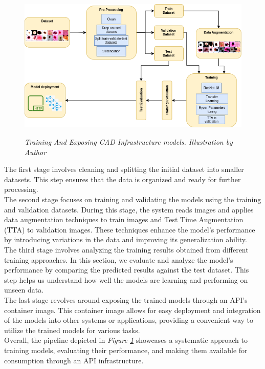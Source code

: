 \begin{figure}[H]
\centering
\includegraphics[width=\textwidth]{imatges/methodological_contribution/Pipeline.drawio.png}
\caption[Training And Exposing CAD Infrastructure models]{\textit{Training And Exposing CAD Infrastructure models. Illustration by Author}}
{\label{fig:cad-infrastructure-training-system}}
\end{figure}

The first stage involves cleaning and splitting the initial dataset into smaller datasets. This step ensures that the data is organized and ready for further processing. \\

The second stage focuses on training and validating the models using the training and validation datasets. During this stage, the system reads images and applies data augmentation techniques to train images and Test Time Augmentation (TTA) to validation images. These techniques enhance the model's performance by introducing variations in the data and improving its generalization ability. \\

The third stage involves analyzing the training results obtained from different training approaches. In this section, we evaluate and analyze the model's performance by comparing the predicted results against the test dataset. This step helps us understand how well the models are learning and performing on unseen data. \\

The last stage revolves around exposing the trained models through an API's container image. This container image allows for easy deployment and integration of the models into other systems or applications, providing a convenient way to utilize the trained models for various tasks. \\

Overall, the pipeline depicted in \textit{Figure \ref{fig:cad-infrastructure-training-system}} showcases a systematic approach to training models, evaluating their performance, and making them available for consumption through an API infrastructure.
